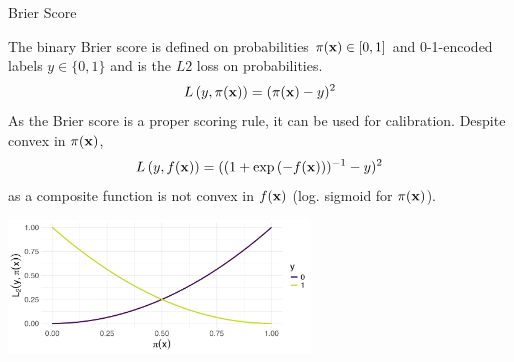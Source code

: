 \documentclass[11pt,compress,t,notes=noshow, xcolor=table]{beamer}
\begin{document}

\begin{vbframe}{Brier Score}

The binary Brier score is defined on probabilities $\pi(\mathbf{x}) \in [0, 1]$ and 0-1-encoded labels $y \in \{0, 1\}$ and is the $L2$ loss on probabilities.
\begin{equation*}
L\left(y, \pi(\mathbf{x})\right) = (\pi(\mathbf{x}) - y)^2
\end{equation*}
As the Brier score is a proper scoring rule, it can be used for calibration. %
Despite convex in $\pi(\mathbf{x})$, $$L\left(y, f(\mathbf{x})\right)=((1+\exp{(-f(\mathbf{x}))})^{-1}-y)^2$$ as a composite function is not convex in $f(\mathbf{x})$ (log. sigmoid for $\pi(\mathbf{x})$).
\vspace{-0.2cm}
\begin{center}
\includegraphics[width = 0.6\textwidth]{figure/brier.png}
\end{center}


\end{vbframe}
\end{document}
